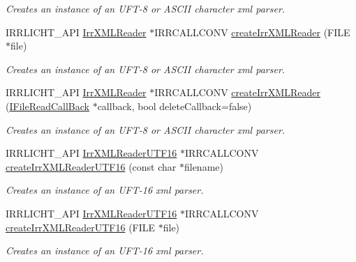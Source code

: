 \begin{DoxyCompactItemize}
\begin{DoxyCompactList}\small\item\em Creates an instance of an U\+F\+T-\/8 or A\+S\+C\+II character xml parser. \end{DoxyCompactList}\item 
I\+R\+R\+L\+I\+C\+H\+T\+\_\+\+A\+PI \hyperlink{namespaceirr_1_1io_a1628edbb9d5d53f18c82d2a92b0ad27e}{Irr\+X\+M\+L\+Reader} $\ast$I\+R\+R\+C\+A\+L\+L\+C\+O\+NV \hyperlink{namespaceirr_1_1io_a9c0ebca5a4addfcfd90f51b5131f7d56}{create\+Irr\+X\+M\+L\+Reader} (F\+I\+LE $\ast$file)
\begin{DoxyCompactList}\small\item\em Creates an instance of an U\+F\+T-\/8 or A\+S\+C\+II character xml parser. \end{DoxyCompactList}\item 
I\+R\+R\+L\+I\+C\+H\+T\+\_\+\+A\+PI \hyperlink{namespaceirr_1_1io_a1628edbb9d5d53f18c82d2a92b0ad27e}{Irr\+X\+M\+L\+Reader} $\ast$I\+R\+R\+C\+A\+L\+L\+C\+O\+NV \hyperlink{namespaceirr_1_1io_af853ea962be4432c2d9a50cc7d303fe5}{create\+Irr\+X\+M\+L\+Reader} (\hyperlink{classirr_1_1io_1_1IFileReadCallBack}{I\+File\+Read\+Call\+Back} $\ast$callback, bool delete\+Callback=false)
\begin{DoxyCompactList}\small\item\em Creates an instance of an U\+F\+T-\/8 or A\+S\+C\+II character xml parser. \end{DoxyCompactList}\item 
I\+R\+R\+L\+I\+C\+H\+T\+\_\+\+A\+PI \hyperlink{namespaceirr_1_1io_a5eb4094dfd0d509e0cd8a9d1dd30a5b9}{Irr\+X\+M\+L\+Reader\+U\+T\+F16} $\ast$I\+R\+R\+C\+A\+L\+L\+C\+O\+NV \hyperlink{namespaceirr_1_1io_a86473ef152c15b685af181a4c5461a5d}{create\+Irr\+X\+M\+L\+Reader\+U\+T\+F16} (const char $\ast$filename)
\begin{DoxyCompactList}\small\item\em Creates an instance of an U\+F\+T-\/16 xml parser. \end{DoxyCompactList}\item 
I\+R\+R\+L\+I\+C\+H\+T\+\_\+\+A\+PI \hyperlink{namespaceirr_1_1io_a5eb4094dfd0d509e0cd8a9d1dd30a5b9}{Irr\+X\+M\+L\+Reader\+U\+T\+F16} $\ast$I\+R\+R\+C\+A\+L\+L\+C\+O\+NV \hyperlink{namespaceirr_1_1io_a7e7ecf8350b446da3a4080f3949bc0b1}{create\+Irr\+X\+M\+L\+Reader\+U\+T\+F16} (F\+I\+LE $\ast$file)
\begin{DoxyCompactList}\small\item\em Creates an instance of an U\+F\+T-\/16 xml parser. \end{DoxyCompactList}\item 

\end{DoxyCompactItemize}
